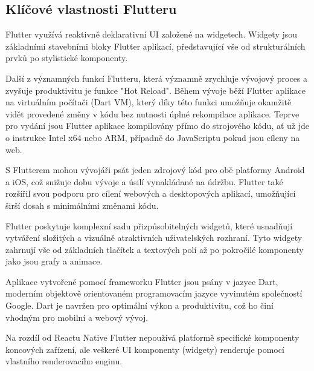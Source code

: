 \subsection*{Klíčové vlastnosti Flutteru}

Flutter využívá reaktivně deklarativní UI založené na widgetech. \cite{flutterUI} Widgety jsou základními stavebními 
bloky Flutter aplikací, představující vše od strukturálních prvků po stylistické komponenty. \cite{flutterWidgets}

Další z významných funkcí Flutteru, která významně zrychluje vývojový proces a zvyšuje produktivitu je funkce "Hot Reload". 
Během vývoje běží Flutter aplikace na virtuálním počítači (Dart VM), který díky této funkci umožňuje okamžitě vidět provedené změny
v kódu bez nutnosti úplné rekompilace aplikace. \cite{flutterHotReload} Teprve pro vydání jsou Flutter aplikace kompilovány přímo do strojového kódu, 
ať už jde o instrukce Intel x64 nebo ARM, případně do JavaScriptu pokud jsou cíleny na web. \cite{flutterArchOverview}


S Flutterem mohou vývojáři psát jeden zdrojový kód pro obě platformy Android a iOS, což snižuje dobu vývoje a úsilí 
vynakládané na údržbu. Flutter také rozšířil svou podporu pro cílení webových a desktopových aplikací, umožňující širší dosah s minimálními změnami kódu. \cite{flutter}

Flutter poskytuje komplexní sadu přizpůsobitelných widgetů, které usnadňují vytváření složitých a vizuálně 
atraktivních uživatelských rozhraní. Tyto widgety zahrnují vše od základních tlačítek a textových polí až po 
pokročilé komponenty jako jsou grafy a animace. \cite{flutterWidgets2}

Aplikace vytvořené pomocí frameworku Flutter jsou psány v jazyce Dart, moderním objektově orientovaném programovacím jazyce 
vyvinutém společností Google. Dart je navržen pro optimální výkon a produktivitu, což ho činí vhodným pro mobilní a
webový vývoj. \cite{dart}

Na rozdíl od Reactu Native Flutter nepoužívá platformě specifické komponenty koncových zařízení, ale veškeré UI komponenty (widgety)
renderuje pomocí vlastního renderovacího enginu. \cite{flutterRenderingModel}


